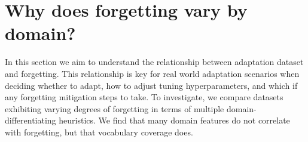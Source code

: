 \documentclass[11pt]{article}
\begin{document}
\section{Why does forgetting vary by domain?}
\label{sec:why}
In this section we aim to understand the relationship between adaptation dataset and forgetting. This relationship is key for real world adaptation scenarios when deciding whether to adapt, how to adjust tuning hyperparameters, and which if any forgetting mitigation steps to take.  To investigate, we compare datasets exhibiting varying degrees of forgetting in terms of multiple  domain-differentiating heuristics. We find that many domain features do not correlate with forgetting, but that vocabulary coverage does. %










\end{document}
